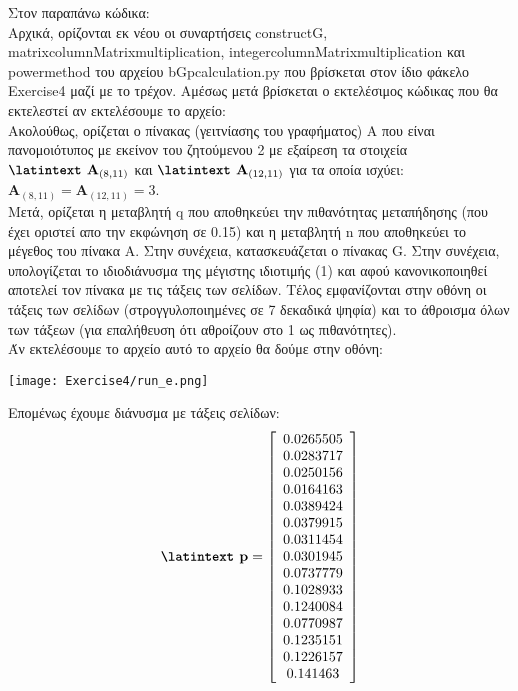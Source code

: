\documentclass[a4paper,11pt]{article}
\newcommand{\lt}{\latintext}
\newcommand{\gt}{\greektext}
\begin{document}
\lt

\gt

Στον παραπάνω κώδικα:\\
Αρχικά, ορίζονται εκ νέου οι  συναρτήσεις {\lt construct\textunderscore G}, {\lt matrix\textunderscore columnMatrix\textunderscore multiplication}, {\lt integer\textunderscore columnMatrix\textunderscore multiplication} και {\lt power\textunderscore method} του αρχείου {\lt b\textunderscore G\textunderscore p\textunderscore calculation.py} που βρίσκεται στον ίδιο φάκελο {\lt Exercise4} μαζί με το τρέχον.
Αμέσως μετά βρίσκεται ο εκτελέσιμος κώδικας που θα εκτελεστεί αν εκτελέσουμε το αρχείο:\\
Ακολούθως, ορίζεται ο πίνακας (γειτνίασης του γραφήματος) Α που είναι πανομοιότυπος με εκείνον του ζητούμενου 2 με εξαίρεση τα στοιχεία $\textbf{{\lt A}}_{(8, 11)}$ και $\textbf{{\lt A}}_{(12, 11)}$ για τα οποία ισχύει: {\lt $\textbf{A}_{(8, 11)} = \textbf{A}_{(12, 11)} = 3$}.\\
Μετά, ορίζεται η μεταβλητή {\lt q} που αποθηκεύει την πιθανότητας μεταπήδησης (που έχει οριστεί απο την εκφώνηση σε 0.15) και η μεταβλητή {\lt n} που αποθηκεύει το μέγεθος του πίνακα Α. Στην συνέχεια, κατασκευάζεται ο πίνακας {\lt G}. Στην συνέχεια, υπολογίζεται το ιδιοδιάνυσμα της μέγιστης ιδιοτιμής (1) και αφού κανονικοποιηθεί αποτελεί τον πίνακα με τις τάξεις των σελίδων. Τέλος εμφανίζονται στην οθόνη οι τάξεις των σελίδων (στρογγυλοποιημένες σε 7 δεκαδικά ψηφία) και το άθροισμα όλων των τάξεων (για επαλήθευση ότι αθροίζουν στο 1 ως πιθανότητες).\\

Άν εκτελέσουμε το αρχείο αυτό το αρχείο θα δούμε στην οθόνη:\\
\begin{center}
    \texttt{[image: Exercise4/run\_e.png]}\\
\end{center}

Επομένως έχουμε διάνυσμα με τάξεις σελίδων:\\
\[\textbf{{\lt p}}=
    \left[ \begin{array}{c}
    0.0265505 \\
    0.0283717 \\
    0.0250156 \\
    0.0164163 \\
    0.0389424 \\
    0.0379915 \\
    0.0311454 \\
    0.0301945 \\
    0.0737779 \\
    0.1028933 \\
    0.1240084 \\
    0.0770987 \\
    0.1235151 \\
    0.1226157 \\
    0.141463 \\
    \end{array} \right]
\]
\end{document}
